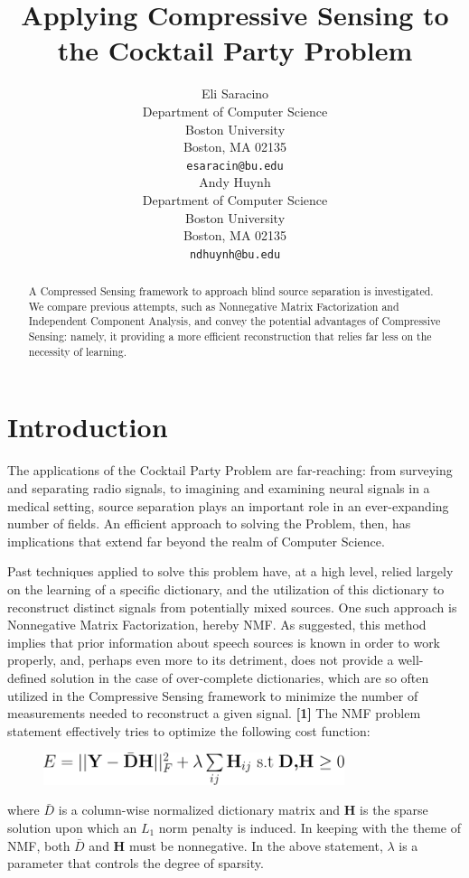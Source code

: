 \documentclass{article}
\title{Applying Compressive Sensing to the Cocktail Party Problem}
\author{
  Eli Saracino \\
  Department of Computer Science\\
  Boston University\\
  Boston, MA 02135 \\
  \texttt{esaracin@bu.edu} \\
  \And
  Andy Huynh \\
  Department of Computer Science \\
  Boston University \\
  Boston, MA 02135 \\
  \texttt{ndhuynh@bu.edu} \\
}
\begin{document}
\maketitle

\begin{abstract}
  A Compressed Sensing framework to approach blind source separation is investigated. We compare previous attempts, such as Nonnegative Matrix Factorization and Independent Component Analysis, and convey the potential advantages of Compressive Sensing: namely, it providing a more efficient reconstruction that relies far less on the necessity of learning.
\end{abstract}

\section{Introduction}
The applications of the Cocktail Party Problem are far-reaching: from surveying and separating radio signals, to imagining and examining neural signals in a medical setting, source separation plays an important role in an ever-expanding number of fields. An efficient approach to solving the Problem, then, has implications that extend far beyond the realm of Computer Science. 

Past techniques applied to solve this problem have, at a high level, relied largely on the learning of a specific dictionary, and the utilization of this dictionary to reconstruct distinct signals from potentially mixed sources. One such approach is Nonnegative Matrix Factorization, hereby NMF. As suggested, this method implies that prior information about speech sources is known in order to work properly, and, perhaps even more to its detriment, does not provide a well-defined solution in the case of over-complete dictionaries, which are so often utilized in the Compressive Sensing framework to minimize the number of measurements needed to reconstruct a given signal. \textbf{[1]} The NMF problem statement effectively tries to optimize the following cost function: 

\begin{figure}[h!]
	\centering
	\includegraphics[width=250pt]{NMF.png}
	\label{Nonnegative Matrix Factorization}
\end{figure}

where \textbf{$\bar{D}$} is a column-wise normalized dictionary matrix and \textbf{H} is the sparse solution upon which an $L_{1}$ norm penalty is induced. In keeping with the theme of NMF, both $\bar{D}$ and \textbf{H} must be nonnegative. In the above statement, $\lambda$ is a parameter that controls the degree of sparsity.
\end{document}
